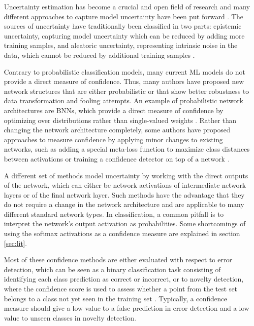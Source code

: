 \documentclass[10pt]{article}
\begin{document}
Uncertainty estimation has become a crucial and open field of research and many different approaches to capture model uncertainty have been put forward \cite{Gal2016Uncertainty, Choi2017UncertaintyAwareLF, KendallG17, subramanya, leibig2017, Sun2018KSconfA}. The sources of uncertainty have traditionally been classified in two parts: epistemic uncertainty, capturing model uncertainty which can be reduced by adding more training samples, and aleatoric uncertainty, representing intrinsic noise in the data, which cannot be reduced by additional training samples \cite{KendallG17}. 

Contrary to probabilistic classification models, many current \gls{ML} models do not provide a direct measure of confidence. Thus, many authors have proposed new network structures that are either probabilistic or that show better robustness to data transformation and fooling attempts. An example of probabilistic network architectures are \glspl{BNN}, which provide a direct measure of confidence by optimizing over distributions rather than single-valued weights \cite{Gal2016Uncertainty, KendallG17}. Rather than changing the network architecture completely, some authors have proposed approaches to measure confidence by applying minor changes to existing networks, such as adding a special meta-loss function to maximize class distances between activations \cite{mandelbaum17} or training a confidence detector on top of a network \cite{Bahat_2018}.  

A different set of methods model uncertainty by working with the direct outputs of the network, which can either be network activations of intermediate network layers or of the final network layer. Such methods have the advantage that they do not require a change in the network architecture and are applicable to many different standard network types. In classification, a common pitfall is to interpret the network's output activation as probabilities. Some shortcomings of using the softmax activations as a confidence measure are explained in section \ref{sec:lit}.

Most of these confidence methods are either evaluated with respect to error detection, which can be seen as a binary classification task consisting of identifying each class prediction as correct or incorrect, or to novelty detection, where the confidence score is used to assess whether a point from the test set belongs to a class not yet seen in the training set \cite{mandelbaum17, deMorsier2014thesis}. Typically, a confidence measure should give a low value to a false prediction in error detection and a low value to unseen classes in novelty detection.
\end{document}

